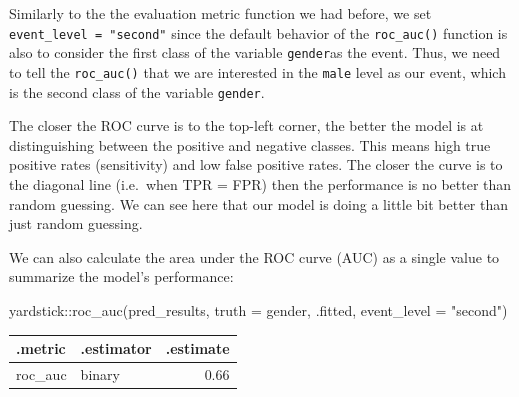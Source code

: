 \documentclass[
  letterpaper,
  DIV=11,
  numbers=noendperiod]{scrartcl}
\newenvironment{Shaded}{\begin{snugshade}}{\end{snugshade}}
\newcommand{\AttributeTok}[1]{\textcolor[rgb]{0.40,0.45,0.13}{#1}}
\newcommand{\FunctionTok}[1]{\textcolor[rgb]{0.28,0.35,0.67}{#1}}
\newcommand{\NormalTok}[1]{\textcolor[rgb]{0.00,0.23,0.31}{#1}}
\newcommand{\SpecialCharTok}[1]{\textcolor[rgb]{0.37,0.37,0.37}{#1}}
\newcommand{\StringTok}[1]{\textcolor[rgb]{0.13,0.47,0.30}{#1}}
\begin{document}
\begin{tcolorbox}[enhanced jigsaw, colframe=quarto-callout-important-color-frame, toprule=.15mm, toptitle=1mm, opacitybacktitle=0.6, breakable, colback=white, opacityback=0, title=\textcolor{quarto-callout-important-color}{\faExclamation}\hspace{0.5em}{Important}, rightrule=.15mm, bottomrule=.15mm, coltitle=black, colbacktitle=quarto-callout-important-color!10!white, leftrule=.75mm, left=2mm, arc=.35mm, bottomtitle=1mm, titlerule=0mm]

Similarly to the the evaluation metric function we had before, we set
\texttt{event\_level\ =\ "second"} since the default behavior of the
\texttt{roc\_auc()} function is also to consider the first class of the
variable \texttt{gender}as the event. Thus, we need to tell the
\texttt{roc\_auc()} that we are interested in the \texttt{male} level as
our event, which is the second class of the variable \texttt{gender}.

\end{tcolorbox}

The closer the ROC curve is to the top-left corner, the better the model
is at distinguishing between the positive and negative classes. This
means high true positive rates (sensitivity) and low false positive
rates. The closer the curve is to the diagonal line (i.e.~when TPR =
FPR) then the performance is no better than random guessing. We can see
here that our model is doing a little bit better than just random
guessing.

We can also calculate the area under the ROC curve (AUC) as a single
value to summarize the model's performance:

\begin{Shaded}
\begin{Highlighting}[]
\NormalTok{yardstick}\SpecialCharTok{::}\FunctionTok{roc\_auc}\NormalTok{(pred\_results,}
        \AttributeTok{truth =}\NormalTok{ gender,}
\NormalTok{        .fitted,}
        \AttributeTok{event\_level =} \StringTok{"second"}\NormalTok{)}
\end{Highlighting}
\end{Shaded}

\begin{longtable}[]{@{}llr@{}}
\toprule\noalign{}
.metric & .estimator & .estimate \\
\midrule\noalign{}
\endhead
\bottomrule\noalign{}
\endlastfoot
roc\_auc & binary & 0.66 \\
\end{longtable}
\end{document}
